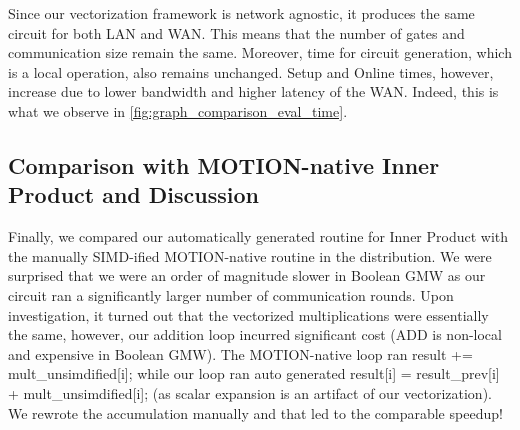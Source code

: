 Since our vectorization framework is network agnostic, it produces the same circuit for both LAN and WAN. This means that the number of gates and communication size remain the same. Moreover, time for circuit generation, which is a local operation, also remains unchanged. Setup and Online times, however, increase due to lower bandwidth and higher latency of the WAN. Indeed, this is what we observe in \cref{fig:graph_comparison_eval_time}.

\begin{comment}
\begin{figure*}[htbp]
\centering
\resizebox{0.7\textwidth}{!}{}
\caption{Communication Size of Benchmarks}
\label{fig:graph_comm_size}
\end{figure*}


\begin{figure*}[htbp]
\centering
\resizebox{0.7\textwidth}{!}{}
\caption{Circuit Generation Time of Benchmarks}
\label{fig:graph_circ_gen_time}
\end{figure*}

\begin{figure*}[htbp]
\centering
\resizebox{0.7\textwidth}{!}{}
\caption{Number of Gates of Benchmarks}
\label{fig:graph_total_gates}
\end{figure*}

\begin{figure*}[htbp]
\centering
\resizebox{0.7\textwidth}{!}{}
\caption{Online Time of Benchmarks}
\label{fig:graph_online_time}
\end{figure*}

\begin{figure*}[htbp]
\centering
\resizebox{0.7\textwidth}{!}{}
\caption{Setup Time of Benchmarks}
\label{fig:graph_setup_time}
\end{figure*}
\end{comment}

\subsection{Comparison with MOTION-native Inner Product and Discussion}

Finally, we compared our automatically generated routine for Inner Product with the manually SIMD-ified MOTION-native routine in the distribution. 
We were surprised that we were an order of magnitude slower in Boolean GMW as our circuit ran a significantly larger 
number of communication rounds. Upon investigation, it turned out that the vectorized multiplications were essentially the same, 
however, our addition loop incurred significant cost (ADD is non-local and expensive in Boolean GMW). The MOTION-native loop ran 
{\sf result += mult\_unsimdified[i];} while our loop ran auto generated {\sf result[i] = result\_prev[i] + mult\_unsimdified[i];} (as scalar expansion
is an artifact of our vectorization). We rewrote the accumulation manually and that led to the comparable speedup!


